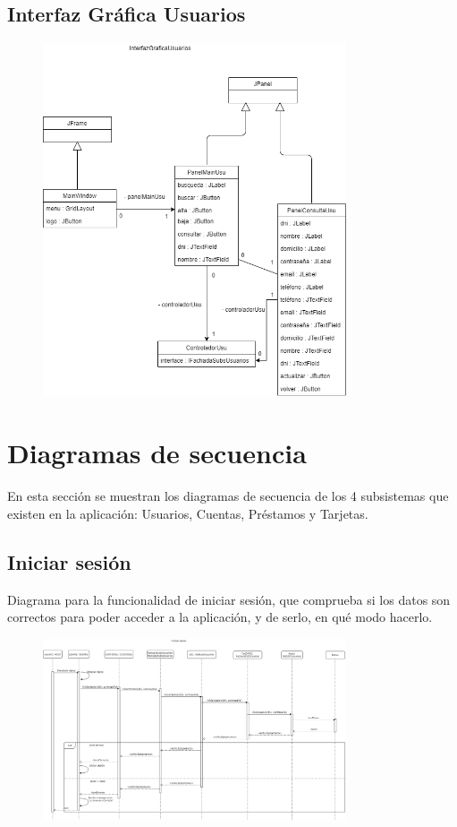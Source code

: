 \documentclass[12pt]{article}
\begin{document}
\subsection{Interfaz Gráfica Usuarios}
\begin{figure}[H]
    \centering
    \includegraphics[width=0.8\textwidth]{images/InterfazGraficaUsuariosFinal.png}
\end{figure}

\newpage
\section{Diagramas de secuencia} %
En esta sección se muestran los diagramas de secuencia de los 4 subsistemas que existen en la aplicación: Usuarios, Cuentas, Préstamos y Tarjetas.
\subsection{Iniciar sesión}
Diagrama para la funcionalidad de iniciar sesión, que comprueba si los datos son correctos para poder acceder a la aplicación, y de serlo, en qué modo hacerlo.
\begin{figure}[H]
    \centering
    \includegraphics[width=0.8\textwidth]{images/1-iniciarSesionFinal.png}
\end{figure}
\end{document}

